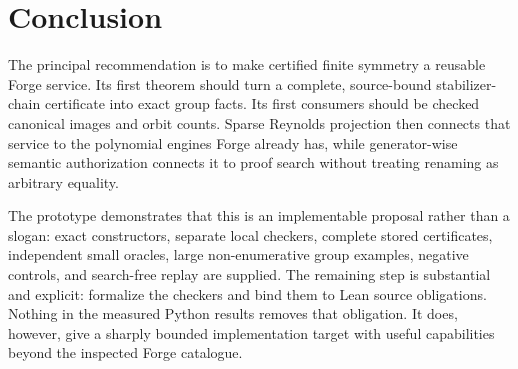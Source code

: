 \section{Conclusion}
The principal recommendation is to make certified finite symmetry a reusable Forge service. Its first theorem should turn a complete, source-bound stabilizer-chain certificate into exact group facts. Its first consumers should be checked canonical images and orbit counts. Sparse Reynolds projection then connects that service to the polynomial engines Forge already has, while generator-wise semantic authorization connects it to proof search without treating renaming as arbitrary equality.

The prototype demonstrates that this is an implementable proposal rather than a slogan: exact constructors, separate local checkers, complete stored certificates, independent small oracles, large non-enumerative group examples, negative controls, and search-free replay are supplied. The remaining step is substantial and explicit: formalize the checkers and bind them to Lean source obligations. Nothing in the measured Python results removes that obligation. It does, however, give a sharply bounded implementation target with useful capabilities beyond the inspected Forge catalogue.
